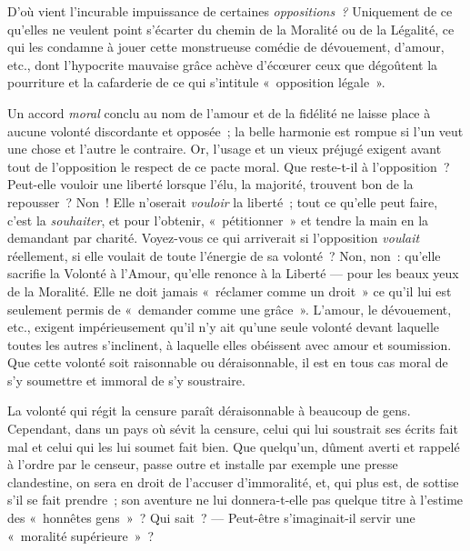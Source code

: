 \documentclass[french,twoside]{book} %
\begin{document}
\noindent D’où vient l’incurable impuissance de certaines \emph{oppositions ?} Uniquement de ce qu’elles ne veulent point s’écarter du chemin de la Moralité ou de la Légalité, ce qui les condamne à jouer cette monstrueuse comédie de dévouement, d’amour, etc., dont l’hypocrite mauvaise grâce achève d’écœurer ceux que dégoûtent la pourriture et la cafarderie de ce qui s’intitule « opposition légale ».\par
Un accord \emph{moral} conclu au nom de l’amour et de la fidélité ne laisse place à aucune volonté discordante et opposée ; la belle harmonie est rompue si l’un veut une chose et l’autre le contraire. Or, l’usage et un vieux préjugé exigent avant tout de l’opposition le respect de ce pacte moral. Que reste-t-il à l’opposition ? Peut-elle vouloir une liberté lorsque l’élu, la majorité, trouvent bon de la repousser ? Non ! Elle n’oserait \emph{vouloir} la liberté ; tout ce qu’elle peut faire, c’est la \emph{souhaiter}, et pour l’obtenir, « pétitionner » et tendre la main en la demandant par charité. Voyez-vous ce qui arriverait si l’opposition \emph{voulait} réellement,  si elle voulait de toute l’énergie de sa volonté ? Non, non : qu’elle sacrifie la Volonté à l’Amour, qu’elle renonce à la Liberté — pour les beaux yeux de la Moralité. Elle ne doit jamais « réclamer comme un droit » ce qu’il lui est seulement permis de « demander comme une grâce ». L’amour, le dévouement, etc., exigent impérieusement qu’il n’y ait qu’une seule volonté devant laquelle toutes les autres s’inclinent, à laquelle elles obéissent avec amour et soumission. Que cette volonté soit raisonnable ou déraisonnable, il est en tous cas moral de s’y soumettre et immoral de s’y soustraire.\par
La volonté qui régit la censure paraît déraisonnable à beaucoup de gens. Cependant, dans un pays où sévit la censure, celui qui lui soustrait ses écrits fait mal et celui qui les lui soumet fait bien. Que quelqu’un, dûment averti et rappelé à l’ordre par le censeur, passe outre et installe par exemple une presse clandestine, on sera en droit de l’accuser d’immoralité, et, qui plus est, de sottise s’il se fait prendre ; son aventure ne lui donnera-t-elle pas quelque titre à l’estime des « honnêtes gens » ? Qui sait ? — Peut-être s’imaginait-il servir une « moralité supérieure » ?\par
\end{document}
